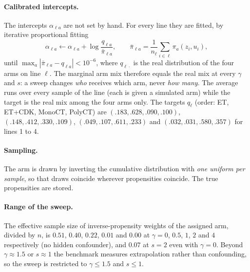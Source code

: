 \paragraph{Calibrated intercepts.} The intercepts $\alpha_{\ell a}$ are not set by hand. For
every line they are fitted, by iterative proportional fitting
\begin{equation}
    \alpha_{\ell a}\leftarrow\alpha_{\ell a}+\log\frac{q_{\ell a}}{\bar\pi_{\ell a}},
    \qquad
    \bar\pi_{\ell a}=\frac{1}{n_\ell}\sum_{i\in\ell}\pi_a(z_i,u_i),
\end{equation}
until $\max_a|\bar\pi_{\ell a}-q_{\ell a}|<10^{-6}$, where $q_{\ell\cdot}$ is the real
distribution of the four arms on line $\ell$. The marginal arm mix therefore equals the real
mix at every $\gamma$ and $s$: a sweep changes \emph{who} receives which arm, never \emph{how
many}. The average runs over every sample of the line (each is given a simulated arm) while
the target is the real mix among the four arms only.
The targets $q_\ell$ (order: ET, ET+CDK, MonoCT, PolyCT) are
$(.183,.628,.090,.100)$, $(.148,.412,.330,.109)$, $(.049,.107,.611,.233)$ and
$(.032,.031,.580,.357)$ for lines 1 to 4.

\paragraph{Sampling.} The arm is drawn by inverting the cumulative distribution with
\emph{one uniform per sample}, so that draws coincide wherever propensities coincide. The true
propensities are stored.

\paragraph{Range of the sweep.} The effective sample size of inverse-propensity weights of the
assigned arm, divided by $n$, is $0.51$, $0.40$, $0.22$, $0.01$ and $0.00$ at $\gamma=0$, $0.5$,
$1$, $2$ and $4$ respectively (no hidden confounder), and $0.07$ at $s=2$ even with $\gamma=0$. Beyond $\gamma\approx1.5$ or
$s\approx1$ the benchmark measures extrapolation rather than confounding, so the sweep is
restricted to $\gamma\le1.5$ and $s\le1$.

